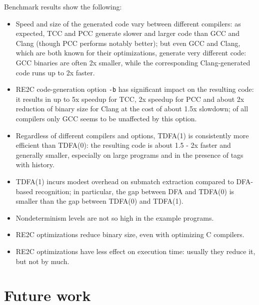 \documentclass{article}
\theoremstyle{definition}
\begin{document}
\begin{multicols}{2}

Benchmark results show the following:

\begin{itemize}
    \setlength{\parskip}{0.5em}

    \item Speed and size of the generated code vary between different compilers:
        as expected, TCC and PCC generate slower and larger code than GCC and Clang (though PCC performs notably better);
        but even GCC and Clang, which are both known for their optimizations, generate very different code:
        GCC binaries are often 2x smaller, while the corresponding Clang-generated code runs up to 2x faster.

    \item RE2C code-generation option \texttt{-b} has significant impact on the resulting code:
        it results in up to 5x speedup for TCC, 2x speedup for PCC and about 2x reduction of binary size for Clang at the cost of about 1.5x slowdown;
        of all compilers only GCC seems to be unaffected by this option.

    \item Regardless of different compilers and options, TDFA(1) is consistently more efficient than TDFA(0):
        the resulting code is about 1.5 - 2x faster and generally smaller,
        especially on large programs and in the presence of tags with history.

    \item TDFA(1) incurs modest overhead on submatch extraction compared to DFA-based recognition;
        in particular, the gap between DFA and TDFA(0) is smaller than the gap between TDFA(0) and TDFA(1).

    \item Nondeterminism levels are not so high in the example programs.

    \item RE2C optimizations reduce binary size, even with optimizing C compilers.

    \item RE2C optimizations have less effect on execution time: usually they reduce it, but not by much.
    \\
\end{itemize}


\section{Future work}\label{section_future_work}


\end{multicols}
\end{document}
